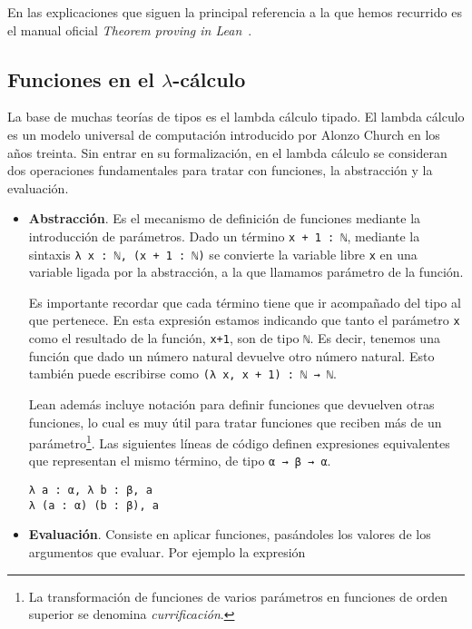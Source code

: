 En las explicaciones que siguen la principal referencia a la que hemos recurrido
es el manual oficial \textit{Theorem proving in Lean}~\cite{avigadLeanTheoremProver}.

\subsection{Funciones en el $\lambda$-c\'{a}lculo}

La base de muchas teorías de tipos es el lambda cálculo tipado. El lambda
cálculo es un modelo universal de computación introducido por Alonzo Church en
los años treinta. Sin entrar en su formalización, en el lambda cálculo se
consideran dos operaciones fundamentales para tratar con funciones, la
abstracción y la evaluación.

\begin{itemize}[topsep=0pt]
	\item \textbf{Abstracción}. Es el mecanismo de definición de funciones mediante
	      la introducción de parámetros. Dado un término \lstinline{x + 1 : ℕ},
	      mediante la sintaxis \lstinline{λ x : ℕ, (x + 1 : ℕ)} se convierte la
	      variable libre \lstinline{x} en una variable ligada por la abstracción, a la
	      que llamamos parámetro de la función.

	      Es importante recordar que cada término tiene que ir acompañado del tipo al
	      que pertenece. En esta expresión estamos indicando que tanto el parámetro
	      \lstinline{x} como el resultado de la función, \lstinline{x+1}, son de tipo
	      \lstinline{ℕ}. Es decir, tenemos una función que dado un número natural
	      devuelve otro número natural. Esto también puede escribirse como
	      \lstinline{(λ x, x + 1) : ℕ → ℕ}.

	      Lean además incluye notación para definir funciones que devuelven
	      otras funciones, lo cual es muy útil para tratar funciones que reciben
	      más de un parámetro\footnote{La transformación de funciones de varios
		      parámetros en funciones de orden superior se denomina
		      \textit{currificación}.}. Las siguientes líneas de código definen
	      expresiones equivalentes que representan el mismo término, de tipo
	      \lstinline{α → β → α}.

	      \begin{lstlisting}
λ a : α, λ b : β, a
λ (a : α) (b : β), a
\end{lstlisting}

	\item \textbf{Evaluación}. Consiste en aplicar funciones, pasándoles los
	      valores de los argumentos que evaluar. Por ejemplo la expresión


\end{itemize}

